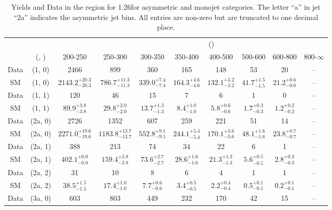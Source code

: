 \begin{table}[h!]
\tiny
\centering
\caption{Yields and Data in the \mj region for 1.26\ifb for asymmetric and monojet categories. The letter ``a'' in jet \eg ``2a''  indicates the asymmetric jet bins. All entries are non-zero but are truncated to one decimal place.\label{tab:yieldsall_mu_comb_asym}}
\begin{tabular}
{cccccccccc}
	\hline\hline
&	&	& \multicolumn{8}{c}{\scalht (\gev)}\\ 
	&	 (\njet, \nb) & 200-250 & 250-300 & 300-350 & 350-400 & 400-500 & 500-600 & 600-800 & 800-$\infty$ \\ [0.8ex] 
\hline
	Data & (1, 0) & 2466 & 899 & 360 & 165 & 148 & 53 & 20 & -- \\[0.5ex] 
	SM & (1, 0) & $2143.2^{+ 20.3 }_{- 20.3 }$ & $786.7^{+ 11.3 }_{- 11.3 }$ & $339.0^{+ 7.4 }_{- 7.4 }$ & $164.3^{+ 4.6 }_{- 4.6 }$ & $132.1^{+ 3.2 }_{- 3.2 }$ & $41.7^{+ 1.5 }_{- 1.5 }$ & $21.2^{+ 0.6 }_{- 0.6 }$ & -- \\[0.5ex] 
	Data & (1, 1) & 120 & 46 & 15 & 7 & 6 & 1 & 0 & -- \\[0.5ex] 
	SM & (1, 1) & $89.9^{+ 3.8 }_{- 3.8 }$ & $29.8^{+ 2.0 }_{- 2.0 }$ & $13.7^{+ 1.3 }_{- 1.3 }$ & $8.4^{+ 1.0 }_{- 1.0 }$ & $5.8^{+ 0.6 }_{- 0.6 }$ & $1.7^{+ 0.3 }_{- 0.3 }$ & $1.2^{+ 0.2 }_{- 0.2 }$ & -- \\[0.5ex] 
	Data & (2a, 0) & 2726 & 1352 & 607 & 259 & 221 & 51 & 14 & -- \\[0.5ex] 
	SM & (2a, 0) & $2271.0^{+ 19.6 }_{- 19.6 }$ & $1183.8^{+ 13.7 }_{- 13.7 }$ & $552.8^{+ 9.1 }_{- 9.1 }$ & $244.1^{+ 5.4 }_{- 5.4 }$ & $170.1^{+ 3.6 }_{- 3.6 }$ & $48.1^{+ 1.6 }_{- 1.6 }$ & $23.8^{+ 0.7 }_{- 0.7 }$ & -- \\[0.5ex] 
	Data & (2a, 1) & 388 & 213 & 74 & 34 & 22 & 6 & 1 & -- \\[0.5ex] 
	SM & (2a, 1) & $402.1^{+ 6.0 }_{- 6.0 }$ & $159.4^{+ 3.8 }_{- 3.8 }$ & $73.6^{+ 2.7 }_{- 2.7 }$ & $28.6^{+ 1.6 }_{- 1.6 }$ & $21.3^{+ 1.3 }_{- 1.3 }$ & $5.6^{+ 0.5 }_{- 0.5 }$ & $2.8^{+ 0.3 }_{- 0.3 }$ & -- \\[0.5ex] 
	Data & (2a, 2) & 31 & 10 & 8 & 6 & 4 & 1 & 1 & -- \\[0.5ex] 
	SM & (2a, 2) & $38.5^{+ 1.5 }_{- 1.5 }$ & $17.4^{+ 1.0 }_{- 1.0 }$ & $7.7^{+ 0.6 }_{- 0.6 }$ & $3.4^{+ 0.5 }_{- 0.5 }$ & $2.2^{+ 0.4 }_{- 0.4 }$ & $0.5^{+ 0.1 }_{- 0.1 }$ & $0.2^{+ 0.1 }_{- 0.1 }$ & -- \\[0.5ex] 
	Data & (3a, 0) & 603 & 803 & 449 & 232 & 170 & 42 & 15 & -- \\[0.5ex] 

\end{tabular}
\end{table}
